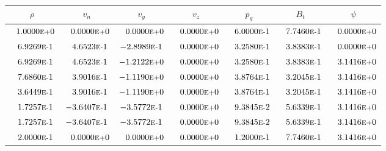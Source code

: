 \begin{tabular*}{\textwidth}{@{\extracolsep{\fill}} ccccccc}
\\ 
\hline 
\hline 
$\rho$ & $v_n$ & $v_y$ & $v_z$ & $p_g$ & $B_t$ & $\psi$ \\ 
\hline 
$\phantom{-} 1.0000\mbox{\sc{e}\smaller{+}}0$ & $\phantom{-} 0.0000\mbox{\sc{e}\smaller{+}}0$ & $\phantom{-} 0.0000\mbox{\sc{e}\smaller{+}}0$ & $\phantom{-} 0.0000\mbox{\sc{e}\smaller{+}}0$ & $\phantom{-} 6.0000\mbox{\sc{e}\smaller{-}}1$ & $\phantom{-} 7.7460\mbox{\sc{e}\smaller{-}}1$ & $\phantom{-} 0.0000\mbox{\sc{e}\smaller{+}}0$ \\ 
$\phantom{-} 6.9269\mbox{\sc{e}\smaller{-}}1$ & $\phantom{-} 4.6523\mbox{\sc{e}\smaller{-}}1$ & $-2.8989\mbox{\sc{e}\smaller{-}}1$ & $\phantom{-} 0.0000\mbox{\sc{e}\smaller{+}}0$ & $\phantom{-} 3.2580\mbox{\sc{e}\smaller{-}}1$ & $\phantom{-} 3.8383\mbox{\sc{e}\smaller{-}}1$ & $\phantom{-} 0.0000\mbox{\sc{e}\smaller{+}}0$ \\ 
$\phantom{-} 6.9269\mbox{\sc{e}\smaller{-}}1$ & $\phantom{-} 4.6523\mbox{\sc{e}\smaller{-}}1$ & $-1.2122\mbox{\sc{e}\smaller{+}}0$ & $\phantom{-} 0.0000\mbox{\sc{e}\smaller{+}}0$ & $\phantom{-} 3.2580\mbox{\sc{e}\smaller{-}}1$ & $\phantom{-} 3.8383\mbox{\sc{e}\smaller{-}}1$ & $\phantom{-} 3.1416\mbox{\sc{e}\smaller{+}}0$ \\ 
$\phantom{-} 7.6860\mbox{\sc{e}\smaller{-}}1$ & $\phantom{-} 3.9016\mbox{\sc{e}\smaller{-}}1$ & $-1.1190\mbox{\sc{e}\smaller{+}}0$ & $\phantom{-} 0.0000\mbox{\sc{e}\smaller{+}}0$ & $\phantom{-} 3.8764\mbox{\sc{e}\smaller{-}}1$ & $\phantom{-} 3.2045\mbox{\sc{e}\smaller{-}}1$ & $\phantom{-} 3.1416\mbox{\sc{e}\smaller{+}}0$ \\ 
$\phantom{-} 3.6449\mbox{\sc{e}\smaller{-}}1$ & $\phantom{-} 3.9016\mbox{\sc{e}\smaller{-}}1$ & $-1.1190\mbox{\sc{e}\smaller{+}}0$ & $\phantom{-} 0.0000\mbox{\sc{e}\smaller{+}}0$ & $\phantom{-} 3.8764\mbox{\sc{e}\smaller{-}}1$ & $\phantom{-} 3.2045\mbox{\sc{e}\smaller{-}}1$ & $\phantom{-} 3.1416\mbox{\sc{e}\smaller{+}}0$ \\ 
$\phantom{-} 1.7257\mbox{\sc{e}\smaller{-}}1$ & $-3.6407\mbox{\sc{e}\smaller{-}}1$ & $-3.5772\mbox{\sc{e}\smaller{-}}1$ & $\phantom{-} 0.0000\mbox{\sc{e}\smaller{+}}0$ & $\phantom{-} 9.3845\mbox{\sc{e}\smaller{-}}2$ & $\phantom{-} 5.6339\mbox{\sc{e}\smaller{-}}1$ & $\phantom{-} 3.1416\mbox{\sc{e}\smaller{+}}0$ \\ 
$\phantom{-} 1.7257\mbox{\sc{e}\smaller{-}}1$ & $-3.6407\mbox{\sc{e}\smaller{-}}1$ & $-3.5772\mbox{\sc{e}\smaller{-}}1$ & $\phantom{-} 0.0000\mbox{\sc{e}\smaller{+}}0$ & $\phantom{-} 9.3845\mbox{\sc{e}\smaller{-}}2$ & $\phantom{-} 5.6339\mbox{\sc{e}\smaller{-}}1$ & $\phantom{-} 3.1416\mbox{\sc{e}\smaller{+}}0$ \\ 
$\phantom{-} 2.0000\mbox{\sc{e}\smaller{-}}1$ & $\phantom{-} 0.0000\mbox{\sc{e}\smaller{+}}0$ & $\phantom{-} 0.0000\mbox{\sc{e}\smaller{+}}0$ & $\phantom{-} 0.0000\mbox{\sc{e}\smaller{+}}0$ & $\phantom{-} 1.2000\mbox{\sc{e}\smaller{-}}1$ & $\phantom{-} 7.7460\mbox{\sc{e}\smaller{-}}1$ & $\phantom{-} 3.1416\mbox{\sc{e}\smaller{+}}0$ \\ 
\hline 
\end{tabular*} 
